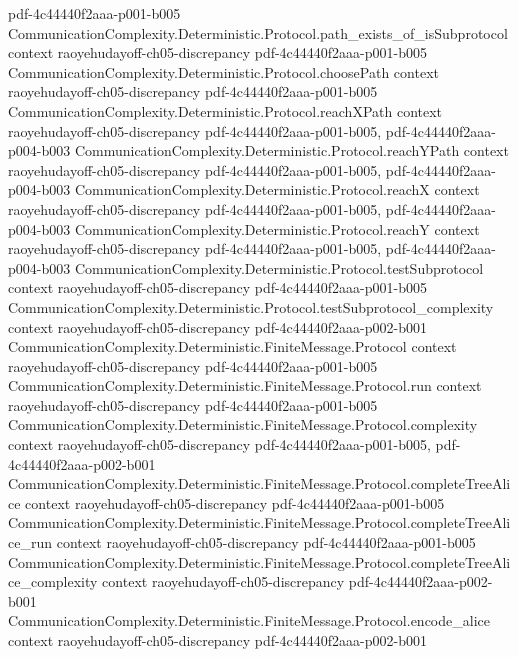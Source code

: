 \begin{lemma}
  {pdf-4c44440f2aaa-p001-b005}
\proofstep
  {CommunicationComplexity.Deterministic.Protocol.path_exists_of_isSubprotocol}
  {context}
  {raoyehudayoff-ch05-discrepancy}
  {pdf-4c44440f2aaa-p001-b005}
\proofstep
  {CommunicationComplexity.Deterministic.Protocol.choosePath}
  {context}
  {raoyehudayoff-ch05-discrepancy}
  {pdf-4c44440f2aaa-p001-b005}
\proofstep
  {CommunicationComplexity.Deterministic.Protocol.reachXPath}
  {context}
  {raoyehudayoff-ch05-discrepancy}
  {pdf-4c44440f2aaa-p001-b005,
    pdf-4c44440f2aaa-p004-b003}
\proofstep
  {CommunicationComplexity.Deterministic.Protocol.reachYPath}
  {context}
  {raoyehudayoff-ch05-discrepancy}
  {pdf-4c44440f2aaa-p001-b005,
    pdf-4c44440f2aaa-p004-b003}
\proofstep
  {CommunicationComplexity.Deterministic.Protocol.reachX}
  {context}
  {raoyehudayoff-ch05-discrepancy}
  {pdf-4c44440f2aaa-p001-b005,
    pdf-4c44440f2aaa-p004-b003}
\proofstep
  {CommunicationComplexity.Deterministic.Protocol.reachY}
  {context}
  {raoyehudayoff-ch05-discrepancy}
  {pdf-4c44440f2aaa-p001-b005,
    pdf-4c44440f2aaa-p004-b003}
\proofstep
  {CommunicationComplexity.Deterministic.Protocol.testSubprotocol}
  {context}
  {raoyehudayoff-ch05-discrepancy}
  {pdf-4c44440f2aaa-p001-b005}
\proofstep
  {CommunicationComplexity.Deterministic.Protocol.testSubprotocol_complexity}
  {context}
  {raoyehudayoff-ch05-discrepancy}
  {pdf-4c44440f2aaa-p002-b001}
\proofstep
  {CommunicationComplexity.Deterministic.FiniteMessage.Protocol}
  {context}
  {raoyehudayoff-ch05-discrepancy}
  {pdf-4c44440f2aaa-p001-b005}
\proofstep
  {CommunicationComplexity.Deterministic.FiniteMessage.Protocol.run}
  {context}
  {raoyehudayoff-ch05-discrepancy}
  {pdf-4c44440f2aaa-p001-b005}
\proofstep
  {CommunicationComplexity.Deterministic.FiniteMessage.Protocol.complexity}
  {context}
  {raoyehudayoff-ch05-discrepancy}
  {pdf-4c44440f2aaa-p001-b005,
    pdf-4c44440f2aaa-p002-b001}
\proofstep
  {CommunicationComplexity.Deterministic.FiniteMessage.Protocol.completeTreeAlice}
  {context}
  {raoyehudayoff-ch05-discrepancy}
  {pdf-4c44440f2aaa-p001-b005}
\proofstep
  {CommunicationComplexity.Deterministic.FiniteMessage.Protocol.completeTreeAlice_run}
  {context}
  {raoyehudayoff-ch05-discrepancy}
  {pdf-4c44440f2aaa-p001-b005}
\proofstep
  {CommunicationComplexity.Deterministic.FiniteMessage.Protocol.completeTreeAlice_complexity}
  {context}
  {raoyehudayoff-ch05-discrepancy}
  {pdf-4c44440f2aaa-p002-b001}
\proofstep
  {CommunicationComplexity.Deterministic.FiniteMessage.Protocol.encode_alice}
  {context}
  {raoyehudayoff-ch05-discrepancy}
  {pdf-4c44440f2aaa-p002-b001}

\end{lemma}
